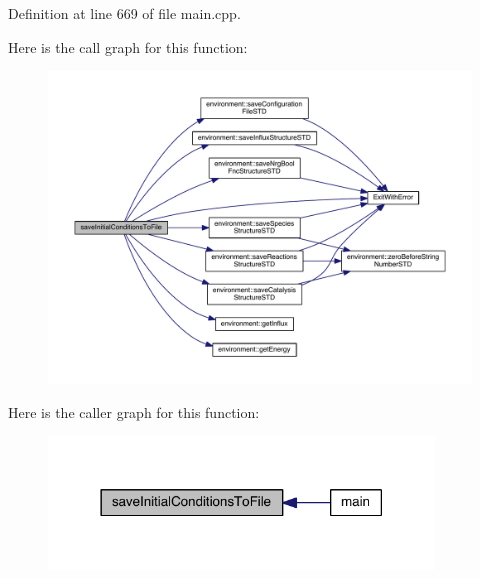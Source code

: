 Definition at line 669 of file main.\-cpp.



Here is the call graph for this function\-:
\nopagebreak
\begin{figure}[H]
\begin{center}
\leavevmode
\includegraphics[width=350pt]{a00089_a4665c5f33b43dfc8fae4757552028cc0_cgraph}
\end{center}
\end{figure}




Here is the caller graph for this function\-:
\nopagebreak
\begin{figure}[H]
\begin{center}
\leavevmode
\includegraphics[width=290pt]{a00089_a4665c5f33b43dfc8fae4757552028cc0_icgraph}
\end{center}
\end{figure}


